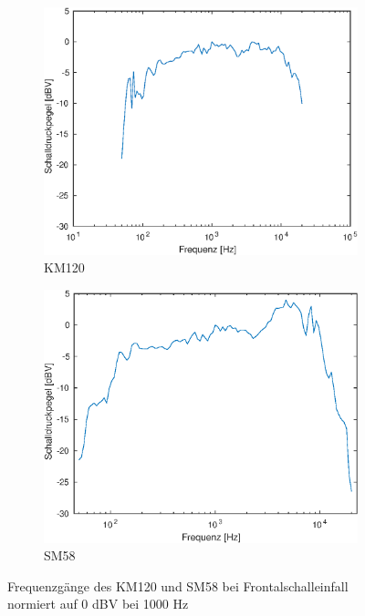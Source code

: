 \begin{figure}[bth]
    \centering
    \begin{subfigure}{.5\textwidth}
        \centering
        \caption{KM120}
        \includegraphics[width=0.95\linewidth]{Figures/km120_0}
    \end{subfigure}%
    \begin{subfigure}{.5\textwidth}
        \centering
        \caption{SM58}
        \includegraphics[width=0.95\linewidth]{Figures/sm58_0}
    \end{subfigure}
    \caption{Frequenzgänge des KM120 und SM58 bei Frontalschalleinfall normiert auf 0 dBV bei 1000 Hz}
    \label{fig:freq_0}
\end{figure}

